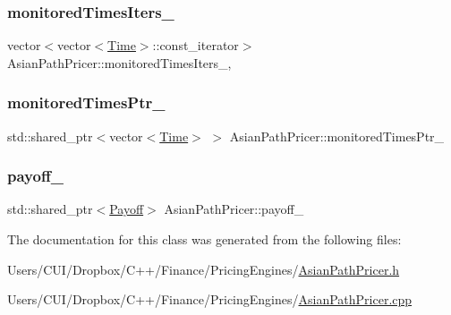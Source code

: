 \subsubsection{\texorpdfstring{monitored\+Times\+Iters\+\_\+}{monitoredTimesIters\_}}
{\footnotesize\ttfamily vector$<$vector$<$\hyperlink{_name_def_8h_ac2d3e0ba793497bcca555c7c2cf64ff3}{Time}$>$\+::const\+\_\+iterator$>$ Asian\+Path\+Pricer\+::monitored\+Times\+Iters\+\_\+\hspace{0.3cm}{\ttfamily [mutable]}, {\ttfamily [private]}}

\hypertarget{class_asian_path_pricer_aa774ae5f2659aee3a7b5e40b3089c3be}{}\label{class_asian_path_pricer_aa774ae5f2659aee3a7b5e40b3089c3be} 
\subsubsection{\texorpdfstring{monitored\+Times\+Ptr\+\_\+}{monitoredTimesPtr\_}}
{\footnotesize\ttfamily std\+::shared\+\_\+ptr$<$vector$<$\hyperlink{_name_def_8h_ac2d3e0ba793497bcca555c7c2cf64ff3}{Time}$>$ $>$ Asian\+Path\+Pricer\+::monitored\+Times\+Ptr\+\_\+\hspace{0.3cm}{\ttfamily [private]}}

\hypertarget{class_asian_path_pricer_a21540fed13894f9f62828d9817de8f5f}{}\label{class_asian_path_pricer_a21540fed13894f9f62828d9817de8f5f} 
\subsubsection{\texorpdfstring{payoff\+\_\+}{payoff\_}}
{\footnotesize\ttfamily std\+::shared\+\_\+ptr$<$\hyperlink{class_payoff}{Payoff}$>$ Asian\+Path\+Pricer\+::payoff\+\_\+\hspace{0.3cm}{\ttfamily [private]}}



The documentation for this class was generated from the following files\+:\begin{DoxyCompactItemize}
\item 
Users/\+C\+U\+I/\+Dropbox/\+C++/\+Finance/\+Pricing\+Engines/\hyperlink{_asian_path_pricer_8h}{Asian\+Path\+Pricer.\+h}\item 
Users/\+C\+U\+I/\+Dropbox/\+C++/\+Finance/\+Pricing\+Engines/\hyperlink{_asian_path_pricer_8cpp}{Asian\+Path\+Pricer.\+cpp}\end{DoxyCompactItemize}
